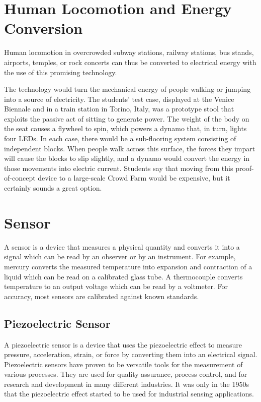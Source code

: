 \documentclass[12pt]{article}
\begin{document}
\newpage

\section*{Human Locomotion and Energy Conversion}
Human locomotion in overcrowded subway stations, railway stations, bus stands, airports, temples, or rock concerts can thus be converted to electrical energy with the use of this promising technology.

The technology would turn the mechanical energy of people walking or jumping into a source of electricity. The students' test case, displayed at the Venice Biennale and in a train station in Torino, Italy, was a prototype stool that exploits the passive act of sitting to generate power. The weight of the body on the seat causes a flywheel to spin, which powers a dynamo that, in turn, lights four LEDs. In each case, there would be a sub-flooring system consisting of independent blocks. When people walk across this surface, the forces they impart will cause the blocks to slip slightly, and a dynamo would convert the energy in those movements into electric current. Students say that moving from this proof-of-concept device to a large-scale Crowd Farm would be expensive, but it certainly sounds a great option.

\section*{Sensor}
A sensor is a device that measures a physical quantity and converts it into a signal which can be read by an observer or by an instrument. For example, mercury converts the measured temperature into expansion and contraction of a liquid which can be read on a calibrated glass tube. A thermocouple converts temperature to an output voltage which can be read by a voltmeter. For accuracy, most sensors are calibrated against known standards.

\subsection*{Piezoelectric Sensor}
A piezoelectric sensor is a device that uses the piezoelectric effect to measure pressure, acceleration, strain, or force by converting them into an electrical signal. Piezoelectric sensors have proven to be versatile tools for the measurement of various processes. They are used for quality assurance, process control, and for research and development in many different industries. It was only in the 1950s that the piezoelectric effect started to be used for industrial sensing applications.
\end{document}
